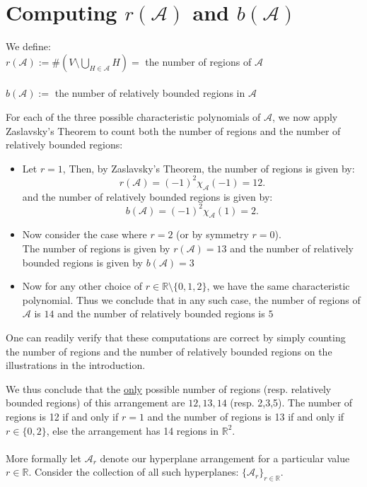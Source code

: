 \documentclass[12pt]{article}
\newcommand{\R}{\mathbb{R}}
\newenvironment{definition}[1][Definition]{\begin{trivlist}
\item[\hskip \labelsep {\bfseries #1}]}{\end{trivlist}}
\newenvironment{remark}[1][Remark]{\begin{trivlist}
\item[\hskip \labelsep {\bfseries #1}]}{\end{trivlist}}
\begin{document}
\section*{Computing $r(\mathcal{A})$ and $b(\mathcal{A})$ }
\begin{definition}
	We define:\\
	$r(\mathcal{A}) := \# (V\setminus \bigcup_{H\in \mathcal{A}}^{} H) = $ the number of regions of $\mathcal{A}$ \\
	\\
	$b(\mathcal{A}) := $ the number of relatively bounded regions in $\mathcal{A}$
\end{definition}
For each of the three possible characteristic polynomials of $\mathcal{A}$, we now apply Zaslavsky's Theorem to count both the number of regions and the number of relatively bounded regions: 
\begin{itemize}
	\item Let $r=1$, Then, by Zaslavsky's Theorem, the number of regions is given by: \[
			r(\mathcal{A}) =(-1)^2 \chi_{\mathcal{A}}(-1) = 12
	.\] 
	and the number of relatively bounded regions is given by: \[
		b(\mathcal{A}) = (-1)^2 \chi_{\mathcal{A}}(1) = 2
	.\] 
\item Now consider the case where $r=2$ (or by symmetry $r=0$).\\
	The number of regions is given by $r(\mathcal{A}) = 13$ and the number of relatively bounded regions is given by $b(\mathcal{A}) = 3$
	\item Now for any other choice of $r\in \R\setminus\{0,1,2\}$, we have the same characteristic polynomial. Thus we conclude that in any such case, the number of regions of $\mathcal{A}$ is  $14$ and the number of relatively bounded regions is $5$
\end{itemize}
\begin{remark}
	One can readily verify that these computations are correct by simply counting the number of regions and the number of relatively bounded regions on the illustrations in the introduction. 
\end{remark}
We thus conclude that the \underline{only} possible number of regions (resp. relatively bounded regions) of this arrangement are $12,13,14$ (resp. 2,3,5). The number of regions is 12 if and only if $r=1$ and the number of regions is 13 if and only if $r\in \{0,2\}$, else the arrangement has 14 regions in $\R^2$.\\
\\
More formally let $\mathcal{A}_r$ denote our hyperplane arrangement for a particular value $r\in \R$. Consider the collection of all such hyperplanes: $\{\mathcal{A}_{r}\}_{r\in \R}$. \\
\end{document}
